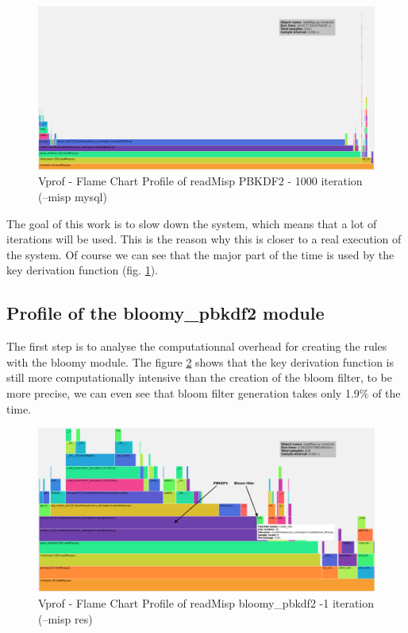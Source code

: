 \documentclass{eplmastersthesis}
\begin{document}
\begin{figure}[h!]
\begin{center}
	\includegraphics[scale=0.3]{res/profile-1000iter}
	\caption{Vprof - Flame Chart Profile of readMisp PBKDF2 - 1000 iteration (--misp mysql)}
	\label{profile-readMisp1000}
\end{center}
\end{figure}

The goal of this work is to slow down the system, which means that a lot of iterations will be used. This is the reason why this is closer to a real execution of the system. Of course we can see that the major part of the time is used by the key derivation function (fig. \ref{profile-readMisp1000}).\\

\subsection{Profile of the bloomy\_pbkdf2 module}
The first step is to analyse the computationnal overhead for creating the rules with the bloomy module. The figure \ref{profile-bloomy-readMisp-1iter} shows that the key derivation function is still more computationally intensive than the creation of the bloom filter, to be more precise, we can even see that bloom filter generation takes only 1.9\% of the time.\\


\begin{figure}[h!]
\begin{center}
	\includegraphics[scale=0.3]{res/readMisp-bloomy-1iter-res}
	\caption{Vprof - Flame Chart Profile of readMisp bloomy\_pbkdf2 -1 iteration (--misp res)}
	\label{profile-bloomy-readMisp-1iter}
\end{center}
\end{figure}
\end{document}
